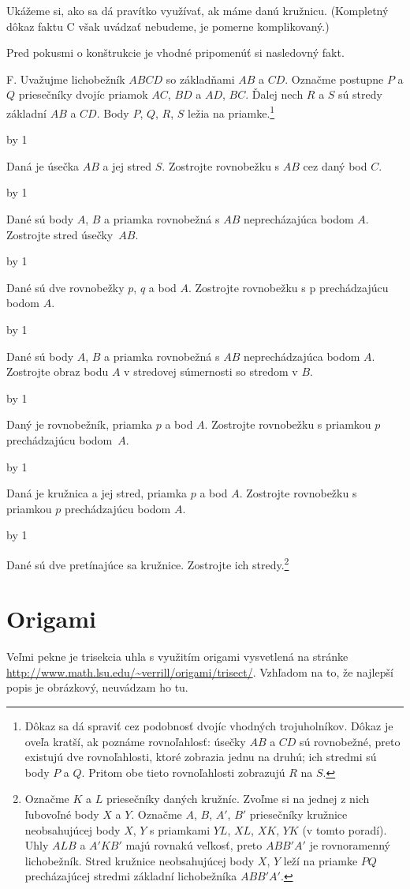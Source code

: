 \documentclass[a4paper]{article}
\def\pr{
    \smallskip
    \noindent {\bf \the\problemNumber.}
    \advance\problemNumber by 1
}
\begin{document}
Ukážeme si, ako sa dá pravítko využívať, ak máme danú kružnicu. (Kompletný dôkaz faktu C však uvádzať nebudeme, je pomerne komplikovaný.)

Pred pokusmi o konštrukcie je vhodné pripomenúť si nasledovný fakt.

F. Uvažujme lichobežník $ABCD$ so základňami $AB$ a $CD$. Označme postupne $P$ a $Q$ priesečníky dvojíc priamok $AC$, $BD$ a $AD$, $BC$. Ďalej nech $R$ a $S$ sú stredy základní $AB$ a $CD$. Body $P$, $Q$, $R$, $S$ ležia na priamke.\footnote{Dôkaz sa dá spraviť cez podobnosť dvojíc vhodných trojuholníkov. Dôkaz je oveľa kratší, ak poznáme rovnoľahlosť: úsečky $AB$ a $CD$ sú rovnobežné, preto existujú dve rovnoľahlosti, ktoré zobrazia jednu na druhú; ich stredmi sú body $P$ a $Q$. Pritom obe tieto rovnoľahlosti zobrazujú $R$ na $S$.}

\pr
Daná je úsečka $AB$ a jej stred $S$. Zostrojte rovnobežku s $AB$ cez daný bod $C$.

\pr
Dané sú body $A$, $B$ a priamka rovnobežná s $AB$ neprecházajúca bodom $A$. Zostrojte stred úsečky~$AB$.

\pr
Dané sú dve rovnobežky $p$, $q$ a bod $A$. Zostrojte rovnobežku s p prechádzajúcu bodom $A$.

\pr
Dané sú body $A$, $B$ a priamka rovnobežná s $AB$ neprechádzajúca bodom $A$. Zostrojte obraz bodu $A$ v stredovej súmernosti so stredom v $B$.

\pr
Daný je rovnobežník, priamka $p$ a bod $A$. Zostrojte rovnobežku s priamkou $p$ prechádzajúcu bodom~$A$.

\pr
Daná je kružnica a jej stred, priamka $p$ a bod $A$. Zostrojte rovnobežku s priamkou $p$ prechádzajúcu bodom $A$.

\pr
Dané sú dve pretínajúce sa kružnice. Zostrojte ich stredy.\footnote{Označme $K$ a $L$ priesečníky daných kružníc. Zvoľme si na jednej z nich ľubovoľné body $X$ a $Y$. Označme $A$, $B$, $A'$, $B'$ priesečníky kružnice neobsahujúcej body $X$, $Y$ s priamkami $YL$, $XL$, $XK$, $YK$ (v tomto poradí). Uhly $ALB$ a $A'KB'$ majú rovnakú veľkosť, preto $ABB'A'$ je rovnoramenný lichobežník. Stred kružnice neobsahujúcej body $X$, $Y$ leží na priamke $PQ$ precházajúcej stredmi základní lichobežníka $ABB'A'$.}


\section{Origami}

Veľmi pekne je trisekcia uhla s využitím origami vysvetlená na stránke \url{http://www.math.lsu.edu/~verrill/origami/trisect/}.
Vzhľadom na to, že najlepší popis je obrázkový, neuvádzam ho tu.
\end{document}
